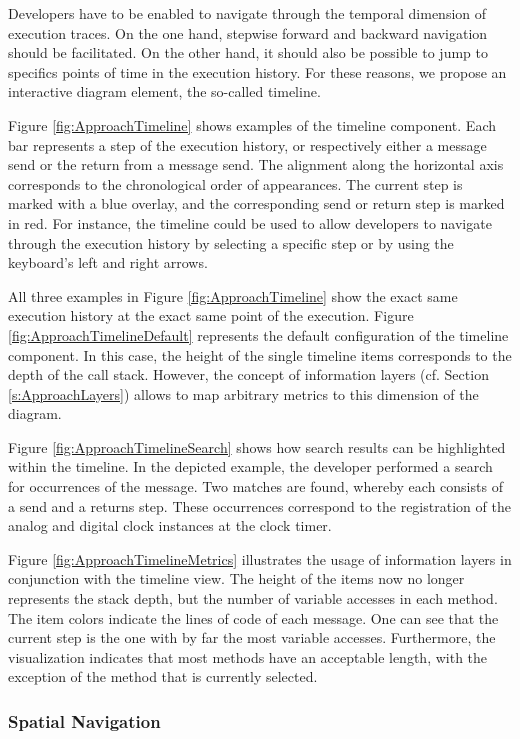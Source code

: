Developers have to be enabled to navigate through the temporal dimension of execution traces.
On the one hand, stepwise forward and backward navigation should be facilitated.
On the other hand, it should also be possible to jump to specifics points of time in the execution history.
For these reasons, we propose an interactive diagram element, the so-called timeline.

Figure \ref{fig:ApproachTimeline} shows examples of the timeline component.
Each bar represents a step of the execution history, or respectively either a message send or the return from a message send.
The alignment along the horizontal axis corresponds to the chronological order of appearances.
The current step is marked with a blue overlay, and the corresponding send or return step is marked in red.
For instance, the timeline could be used to allow developers to navigate through the execution history by selecting a specific step or by using the keyboard's left and right arrows.

All three examples in Figure \ref{fig:ApproachTimeline} show the exact same execution history at the exact same point of the execution.
Figure \ref{fig:ApproachTimelineDefault} represents the default configuration of the timeline component.
In this case, the height of the single timeline items corresponds to the depth of the call stack.
However, the concept of information layers (cf. Section \ref{s:ApproachLayers}) allows to map arbitrary metrics to this dimension of the diagram.

Figure \ref{fig:ApproachTimelineSearch} shows how search results can be highlighted within the timeline.
In the depicted example, the developer performed a search for occurrences of the  message.
Two matches are found, whereby each consists of a send and a returns step.
These occurrences correspond to the registration of the analog and digital clock instances at the clock timer.

Figure \ref{fig:ApproachTimelineMetrics} illustrates the usage of information layers in conjunction with the timeline view.
The height of the items now no longer represents the stack depth, but the number of variable accesses in each method.
The item colors indicate the lines of code of each message.
One can see that the current step is the one with by far the most variable accesses.
Furthermore, the visualization indicates that most methods have an acceptable length, with the exception of the method that is currently selected.

\subsubsection{Spatial Navigation}

